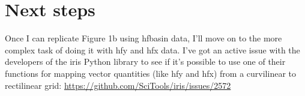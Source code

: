 \section{Next steps}

Once I can replicate Figure 1b using hfbasin data, I'll move on to the more complex task of doing it with hfy and hfx data. I've got an active issue with the developers of the iris Python library to see if it's possible to use one of their functions for mapping vector quantities (like hfy and hfx) from a curvilinear to rectilinear grid: \url{https://github.com/SciTools/iris/issues/2572}